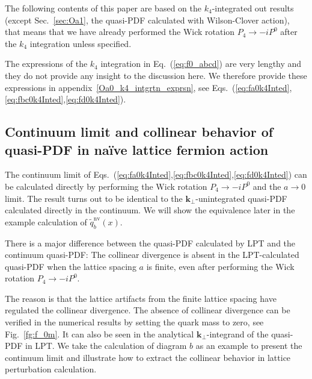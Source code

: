 \documentclass[english,preprint,aps,prd,showpacs,superscriptaddress,nofootinbib,tightenlines]{revtex4}
\begin{document}
The following contents of this paper are based on the $k_4$-integrated out results (except Sec.~\ref{sec:Oa1}, the quasi-PDF calculated with Wilson-Clover action), that means that we have already performed the Wick rotation $P_4\rightarrow-iP^0$ after the $k_4$ integration unless specified.

The expressions of the $k_4$ integration in Eq.~(\ref{eq:f0_abcd}) are very lengthy and they do not provide any insight to the discussion here. We therefore provide these expressions in appendix~\ref{Oa0_k4_intgrtn_exprsn}, see Eqs.~(\ref{eq:fa0k4Inted},\ref{eq:fbc0k4Inted},\ref{eq:fd0k4Inted}).

  
\subsection{Continuum limit and collinear behavior of quasi-PDF in na\"ive lattice fermion action}\label{Sec:Cntnm_ClnrDvgnc}
The continuum limit of Eqs.~(\ref{eq:fa0k4Inted},\ref{eq:fbc0k4Inted},\ref{eq:fd0k4Inted})
can be calculated directly by performing the Wick rotation $P_{4}\rightarrow-iP^0$
and the $a\rightarrow0$ limit. The result turns out to be identical to
the $\boldsymbol{k}_{\perp}$-unintegrated quasi-PDF calculated directly
in the continuum. We will show the equivalence later in the example calculation of $\tilde{q}^{\mathrm{nv}}_b\left(x\right)$.

There is a major difference between the quasi-PDF calculated by LPT and the
continuum quasi-PDF: The collinear divergence is absent in the LPT-calculated quasi-PDF when the lattice spacing $a$ is finite, even after performing the Wick rotation $P_4\rightarrow -iP^0$. 

The reason is that the lattice artifacts from the finite lattice spacing have regulated the
collinear divergence. The absence of collinear divergence can be verified
in the numerical results by setting the quark mass to zero, see Fig.~\ref{fg:f_0m}.  It can  also be seen in the analytical $\boldsymbol{k}_{\perp}$-integrand
of  the quasi-PDF in LPT. We take the calculation of diagram ${b}$ as
an example to present the continuum limit and illustrate how to extract the collinear behavior in lattice perturbation calculation.
\end{document}
